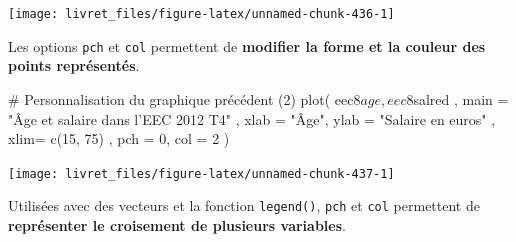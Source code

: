 \documentclass[12pt,twosided, notitlepage]{book}
\newenvironment{Shaded}{}{}
\newcommand{\KeywordTok}[1]{\textcolor[rgb]{0.00,0.00,1.00}{#1}}
\newcommand{\DataTypeTok}[1]{#1}
\newcommand{\DecValTok}[1]{#1}
\newcommand{\StringTok}[1]{\textcolor[rgb]{0.00,0.50,0.50}{#1}}
\newcommand{\CommentTok}[1]{\textcolor[rgb]{0.00,0.50,0.00}{#1}}
\newcommand{\OperatorTok}[1]{#1}
\newcommand{\NormalTok}[1]{#1}
\renewenvironment{Shaded}{\begin{snugshade}}{\end{snugshade}}
\begin{document}
\begin{center}\texttt{[image: livret\_files/figure-latex/unnamed-chunk-436-1]} \end{center}

Les options \texttt{pch} et \texttt{col} permettent de \textbf{modifier
la forme et la couleur des points représentés}.

\begin{Shaded}
\begin{Highlighting}[]
\CommentTok{# Personnalisation du graphique précédent (2)}
\KeywordTok{plot}\NormalTok{(}
\NormalTok{  eec8}\OperatorTok{$}\NormalTok{age, eec8}\OperatorTok{$}\NormalTok{salred}
\NormalTok{  , }\DataTypeTok{main =} \StringTok{"Âge et salaire dans l'EEC 2012 T4"}
\NormalTok{  , }\DataTypeTok{xlab =} \StringTok{"Âge"}\NormalTok{, }\DataTypeTok{ylab =} \StringTok{"Salaire en euros"}
\NormalTok{  , }\DataTypeTok{xlim=} \KeywordTok{c}\NormalTok{(}\DecValTok{15}\NormalTok{, }\DecValTok{75}\NormalTok{)}
\NormalTok{  , }\DataTypeTok{pch =} \DecValTok{0}\NormalTok{, }\DataTypeTok{col =} \DecValTok{2}
\NormalTok{)}
\end{Highlighting}
\end{Shaded}

\begin{center}\texttt{[image: livret\_files/figure-latex/unnamed-chunk-437-1]} \end{center}

Utilisées avec des vecteurs et la fonction
\texttt{legend()}, \texttt{pch} et
\texttt{col} permettent de \textbf{représenter le croisement de
plusieurs variables}.

\begin{Shaded}
\end{Shaded}
\end{document}
